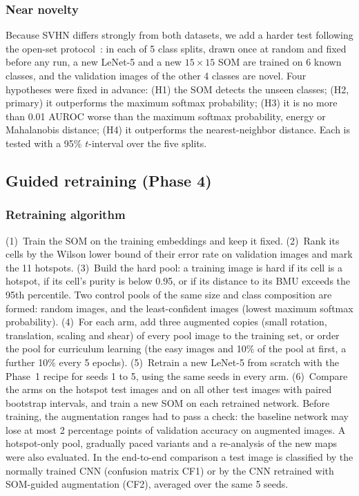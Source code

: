 \documentclass[preprint,review,12pt]{elsarticle}
\begin{document}
\subsubsection{Near novelty}
Because SVHN differs strongly from both datasets, we add a harder test following the open-set protocol~\cite{neal2018open}: in each of 5 class splits, drawn once at random and fixed before any run, a new LeNet-5 and a new $15\times15$ SOM are trained on 6 known classes, and the validation images of the other 4 classes are novel. Four hypotheses were fixed in advance: (H1) the SOM detects the unseen classes; (H2, primary) it outperforms the maximum softmax probability; (H3) it is no more than 0.01 AUROC worse than the maximum softmax probability, energy or Mahalanobis distance; (H4) it outperforms the nearest-neighbor distance. Each is tested with a 95\% $t$-interval over the five splits.

\subsection{Guided retraining (Phase 4)}

\subsubsection{Retraining algorithm}
(1)~Train the SOM on the training embeddings and keep it fixed. (2)~Rank its cells by the Wilson lower bound of their error rate on validation images and mark the 11 hotspots. (3)~Build the hard pool: a training image is hard if its cell is a hotspot, if its cell's purity is below 0.95, or if its distance to its BMU exceeds the 95th percentile. Two control pools of the same size and class composition are formed: random images, and the least-confident images (lowest maximum softmax probability). (4)~For each arm, add three augmented copies (small rotation, translation, scaling and shear) of every pool image to the training set, or order the pool for curriculum learning (the easy images and 10\% of the pool at first, a further 10\% every 5 epochs). (5)~Retrain a new LeNet-5 from scratch with the Phase~1 recipe for seeds 1 to 5, using the same seeds in every arm. (6)~Compare the arms on the hotspot test images and on all other test images with paired bootstrap intervals, and train a new SOM on each retrained network. Before training, the augmentation ranges had to pass a check: the baseline network may lose at most 2 percentage points of validation accuracy on augmented images. A hotspot-only pool, gradually paced variants and a re-analysis of the new maps were also evaluated. In the end-to-end comparison a test image is classified by the normally trained CNN (confusion matrix CF1) or by the CNN retrained with SOM-guided augmentation (CF2), averaged over the same 5 seeds.
\end{document}

